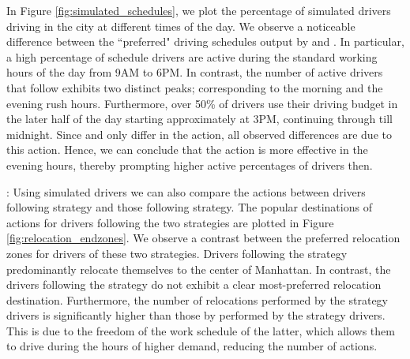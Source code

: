 In Figure \ref{fig:simulated_schedules}, we plot the percentage of simulated drivers driving in the city at different times of the day. We observe a noticeable difference between the ``preferred" driving schedules 
output by {\flexible} and {\relocationflexible}.
In particular, a high percentage of {\flexible} schedule drivers are active during the standard working hours of the day from 9AM to 6PM. In contrast, the number of active
drivers that follow {\relocationflexible} exhibits two distinct peaks; corresponding to the morning and the evening rush hours. Furthermore, over 50\% of {\relocationflexible} drivers use their driving budget in the later half of the day starting approximately at 3PM, continuing through till midnight. 
Since {\flexible} and {\relocationflexible} only differ in 
the {\relocate} action, all observed differences are due to this action.
Hence, we can  conclude that the {\relocate} action is more effective in the evening hours, thereby prompting higher active percentages of {\relocationflexible} drivers then.

: Using simulated drivers we can also compare the {\relocate} actions between drivers following {\relocation} strategy and those following {\relocationflexible} strategy. The popular destinations of {\relocate} actions for drivers following the two strategies are plotted in Figure \ref{fig:relocation_endzones}. We observe a contrast between the preferred relocation zones for drivers of these two strategies. Drivers following the {\relocation} strategy predominantly relocate themselves to the center of Manhattan. In contrast, the drivers following the {\relocationflexible} strategy do not exhibit a clear most-preferred relocation destination. Furthermore, the number of relocations performed by the {\relocation} strategy drivers 
is significantly higher than those by performed by the {\relocationflexible} strategy drivers. 
This is due to the freedom of the work schedule of the latter, which allows them to drive during the hours of higher demand, reducing the number of {\relocate} actions. 

